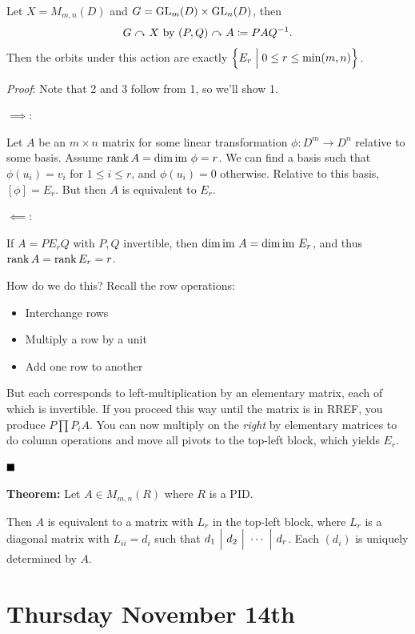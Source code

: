 Let \(X = M_{m, n}(D)\) and \(G = {\text{GL}}_m(D) \times {\text{GL}}_n(D)\), then
\begin{align*}
G \curvearrowright X \text{ by } (P, Q) \curvearrowright A \coloneqq PAQ^{-1}
.\end{align*} Then the orbits under this action are exactly
\(\left\{{E_r \mathrel{\Big|} 0 \leq r \leq \min(m, n)}\right\}\).

\emph{Proof}: Note that 2 and 3 follow from 1, so we'll show 1.

\(\implies\):

Let \(A\) be an \(m\times n\) matrix for some linear transformation
\(\phi: D^m \to D^n\) relative to some basis. Assume
\(\operatorname{rank} A = \dim {\text{im}~} \phi = r\). We can find a basis such that
\(\phi(u_i) = v_i\) for \(1 \leq i \leq r\), and \(\phi(u_i) = 0\)
otherwise. Relative to this basis, \([\phi] = E_r\). But then \(A\) is
equivalent to \(E_r\).

\(\impliedby\):

If \(A = PE_r Q\) with \(P, Q\) invertible, then
\(\dim {\text{im}~} A = \dim {\text{im}~} E_r\), and thus \(\operatorname{rank} A = \operatorname{rank} E_r = r\).

How do we do this? Recall the row operations:

\begin{itemize}
\item
  Interchange rows
\item
  Multiply a row by a unit
\item
  Add one row to another
\end{itemize}

But each corresponds to left-multiplication by an elementary matrix,
each of which is invertible. If you proceed this way until the matrix is
in RREF, you produce \(P \prod P_i A\). You can now multiply on the
\emph{right} by elementary matrices to do column operations and move all
pivots to the top-left block, which yields \(E_r\).

\(\qed\)

\textbf{Theorem:} Let \(A \in M_{m, n}(R)\) where \(R\) is a PID.

Then \(A\) is equivalent to a matrix with \(L_r\) in the top-left block,
where \(L_r\) is a diagonal matrix with \(L_{ii} = d_i\) such that
\(d_1 {~\Bigm| ~} d_2 {~\Bigm| ~} \cdots {~\Bigm| ~} d_r\). Each \((d_i)\) is
uniquely determined by \(A\).

\hypertarget{thursday-november-14th}{%
\section{Thursday November 14th}\label{thursday-november-14th}}

